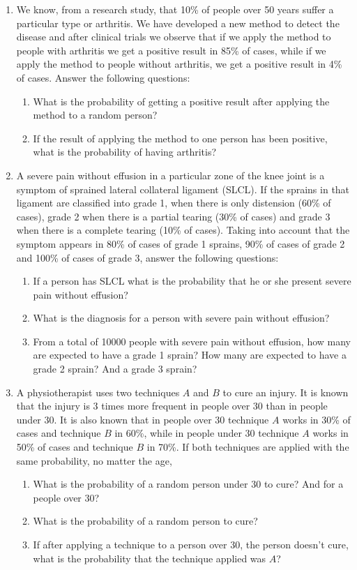 \begin{enumerate}[leftmargin=*,resume]
\item We know, from a research study, that 10\% of people over 50 years suffer a particular type or arthritis.
We have developed a new method to detect the disease and after clinical trials we observe that if we apply the method to
people with arthritis we get a positive result in 85\% of cases, while if we apply the method to people without
arthritis, we get a positive result in 4\% of cases.
Answer the following questions:
\begin{enumerate}
\item What is the probability of getting a positive result after applying the method to a random person?
\item If the result of applying the method to one person has been positive, what is the probability of having arthritis?
\end{enumerate}

\item A severe pain without effusion in a particular zone of the knee joint is a symptom of sprained lateral collateral
ligament (SLCL). 
If the sprains in that ligament are classified into grade 1, when there is only distension (60\% of cases), grade 2 when
there is a partial tearing (30\% of cases) and grade 3 when there is a complete tearing (10\% of cases).
Taking into account that the symptom appears in 80\% of cases of grade 1 sprains, 90\% of cases of grade 2 and 100\% of
cases of grade 3, answer the following questions:

\begin{enumerate}
\item If a person has SLCL what is the probability that he or she present severe pain without effusion?
\item What is the diagnosis for a person with severe pain without effusion?
\item From a total of 10000 people with severe pain without effusion, how many are expected to have a grade 1 sprain? 
How many are expected to have a grade 2 sprain? And a grade 3 sprain?
\end{enumerate}

\item A physiotherapist uses two techniques $A$ and $B$ to cure an injury.
It is known that the injury is 3 times more frequent in people over 30 than in people under 30. 
It is also known that in people over 30 technique $A$ works in 30\% of cases and technique $B$ in 60\%, while in people
under 30 technique $A$ works in 50\% of cases and technique $B$ in 70\%. 
If both techniques are applied with the same probability, no matter the age, 
\begin{enumerate}
\item What is the probability of a random person under 30 to cure? And for a people over 30?
\item What is the probability of a random person to cure?
\item If after applying a technique to a person over 30, the person doesn't cure, what is the probability that the
technique applied was $A$?
\end{enumerate}


\end{enumerate}

